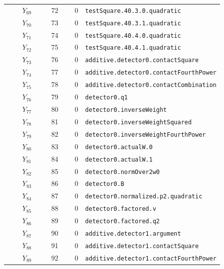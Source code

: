 {\begin{longtable}{@{}r r r p{0.64\linewidth}@{}}
\(Y_{69}\) & 72 & 0 & \texttt{testSquare.\allowbreak{}40.\allowbreak{}3.\allowbreak{}0.\allowbreak{}quadratic} \\
\(Y_{70}\) & 73 & 0 & \texttt{testSquare.\allowbreak{}40.\allowbreak{}3.\allowbreak{}1.\allowbreak{}quadratic} \\
\(Y_{71}\) & 74 & 0 & \texttt{testSquare.\allowbreak{}40.\allowbreak{}4.\allowbreak{}0.\allowbreak{}quadratic} \\
\(Y_{72}\) & 75 & 0 & \texttt{testSquare.\allowbreak{}40.\allowbreak{}4.\allowbreak{}1.\allowbreak{}quadratic} \\
\(Y_{73}\) & 76 & 0 & \texttt{additive.\allowbreak{}detector0.\allowbreak{}contactSquare} \\
\(Y_{74}\) & 77 & 0 & \texttt{additive.\allowbreak{}detector0.\allowbreak{}contactFourthPower} \\
\(Y_{75}\) & 78 & 0 & \texttt{additive.\allowbreak{}detector0.\allowbreak{}contactCombination} \\
\(Y_{76}\) & 79 & 0 & \texttt{detector0.\allowbreak{}q1} \\
\(Y_{77}\) & 80 & 0 & \texttt{detector0.\allowbreak{}inverseWeight} \\
\(Y_{78}\) & 81 & 0 & \texttt{detector0.\allowbreak{}inverseWeightSquared} \\
\(Y_{79}\) & 82 & 0 & \texttt{detector0.\allowbreak{}inverseWeightFourthPower} \\
\(Y_{80}\) & 83 & 0 & \texttt{detector0.\allowbreak{}actualW.\allowbreak{}0} \\
\(Y_{81}\) & 84 & 0 & \texttt{detector0.\allowbreak{}actualW.\allowbreak{}1} \\
\(Y_{82}\) & 85 & 0 & \texttt{detector0.\allowbreak{}normOver2w0} \\
\(Y_{83}\) & 86 & 0 & \texttt{detector0.\allowbreak{}B} \\
\(Y_{84}\) & 87 & 0 & \texttt{detector0.\allowbreak{}normalized.\allowbreak{}p2.\allowbreak{}quadratic} \\
\(Y_{85}\) & 88 & 0 & \texttt{detector0.\allowbreak{}factored.\allowbreak{}v} \\
\(Y_{86}\) & 89 & 0 & \texttt{detector0.\allowbreak{}factored.\allowbreak{}q2} \\
\(Y_{87}\) & 90 & 0 & \texttt{additive.\allowbreak{}detector1.\allowbreak{}argument} \\
\(Y_{88}\) & 91 & 0 & \texttt{additive.\allowbreak{}detector1.\allowbreak{}contactSquare} \\
\(Y_{89}\) & 92 & 0 & \texttt{additive.\allowbreak{}detector1.\allowbreak{}contactFourthPower} \\

\end{longtable}}
